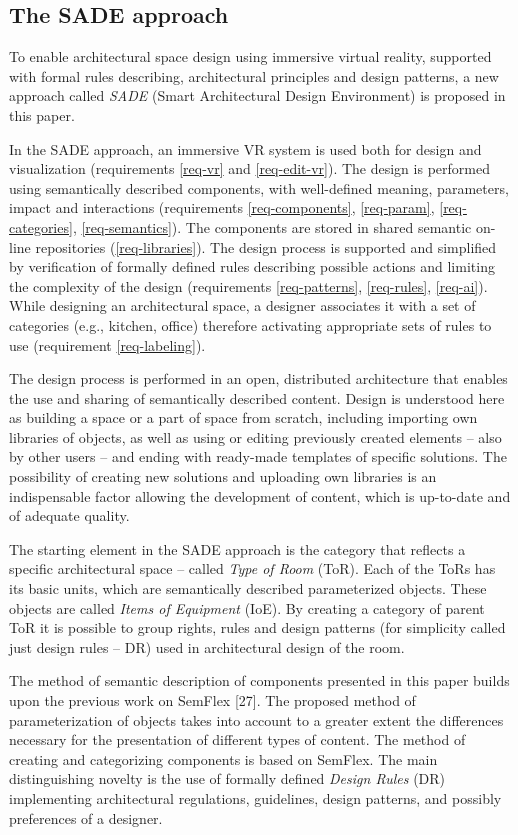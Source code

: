 \documentclass[runningheads]{llncs}
\begin{document}
\subsection{The SADE approach}
To enable architectural space design using immersive virtual reality, supported with formal rules describing, architectural principles and design patterns, a new approach called \textit{SADE} (Smart Architectural Design Environment) is proposed in this paper.

In the SADE approach, an immersive VR system is used both for design and visualization (requirements \ref{req-vr} and \ref{req-edit-vr}). The design is performed using semantically
described components, with well-defined meaning, parameters, impact and interactions (requirements \ref{req-components}, \ref {req-param}, \ref{req-categories}, \ref{req-semantics}). The components are stored in shared semantic on-line repositories (\ref{req-libraries}). The design process is supported and simplified by   verification of formally defined rules describing possible actions and limiting the complexity of the design (requirements \ref{req-patterns}, \ref{req-rules}, \ref{req-ai}). While designing an architectural space, a designer associates it with a set of categories (e.g., kitchen, office) therefore activating appropriate sets of rules to use (requirement \ref{req-labeling}).


The design process is performed in an open, distributed architecture that enables the use and  sharing of semantically described content. Design is understood here as building a space or a part of space from scratch, including importing own libraries of objects, as well as using or editing previously created elements -- also by other users -- and ending with ready-made templates of specific solutions. The possibility of creating new solutions and uploading own libraries is an indispensable factor allowing the development of content, which is up-to-date and of adequate quality.

The starting element in the SADE approach is the category that reflects a specific architectural space -- called \textit{Type of Room} (ToR). Each of the ToRs has its basic units, which are semantically described parameterized objects. These objects are called \textit{Items of Equipment} (IoE).
By creating a category of parent ToR it is possible to group rights, rules and design patterns (for simplicity called just design rules -- DR) used in architectural design of the room. 

The method of semantic description of components presented in this paper builds upon the previous work on SemFlex [27]. The proposed method of parameterization of objects takes into account to a greater extent the differences necessary for the presentation of different types of content. The method of creating and categorizing components is based on SemFlex. The main distinguishing novelty is the use of formally defined \textit{Design Rules} (DR) implementing architectural regulations, guidelines, design patterns, and possibly preferences of a designer.  
\end{document}
